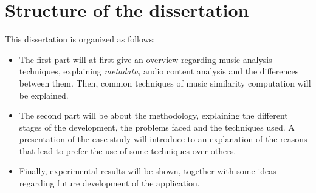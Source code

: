 \section{Structure of the dissertation}
This dissertation is organized as follows:
\begin{itemize}
\item The first part will at first give an overview regarding music analysis techniques, explaining \textit{metadata}, audio content analysis and the differences between them. Then, common techniques of music similarity computation will be explained. 
\item The second part will be about the methodology, explaining the different stages of the development, the problems faced and the techniques used. A presentation of the case study will introduce to an explanation of the reasons that lead to prefer the use of some techniques over others.
\item Finally, experimental results will be shown, together with some ideas regarding future development of the application.
\end{itemize}


\newpage
\thispagestyle{headings}
\mbox{}